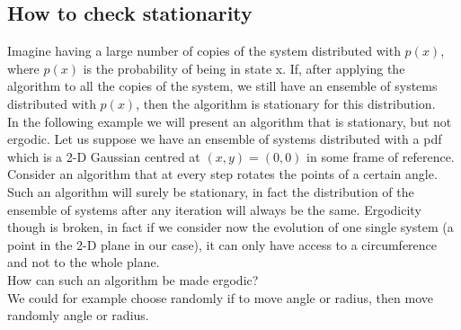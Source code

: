 \subsection{How to check stationarity}
Imagine having a large number of copies of the system distributed with $p\left(x\right)$, where $p\left(x\right)$ is the probability of being in state x. If, after applying the algorithm to all the copies of the system, we still have an ensemble of systems distributed with $p\left(x\right)$, then the algorithm is stationary for this distribution.
\smallskip
\\
In the following example we will present an algorithm that is stationary, but not ergodic.
Let us suppose we have an ensemble of systems distributed with a pdf which is a 2-D Gaussian centred at $\left(x,y\right)=\left(0,0\right)$ in some frame of reference. Consider an algorithm that at every step rotates the points of a certain angle. Such an algorithm will surely be stationary, in fact the distribution of the ensemble of systems after any iteration will always be the same. Ergodicity though is broken, in fact if we consider now the evolution of one single system (a point in the 2-D plane in our case), it can only have access to a circumference and not to the whole plane.
\smallskip
\\
How can such an algorithm be made ergodic?
\smallskip
\\
We could for example choose randomly if to move angle or radius, then move randomly angle or radius.
